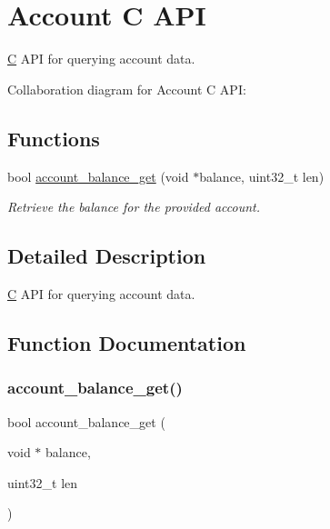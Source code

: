 \hypertarget{group__accountcapi}{}\section{Account C A\+PI}
\label{group__accountcapi}


\mbox{\hyperlink{struct_c}{C}} A\+PI for querying account data.  


Collaboration diagram for Account C A\+PI\+:
\subsection*{Functions}
\begin{DoxyCompactItemize}
\item 
bool \mbox{\hyperlink{group__accountcapi_gabc0d83c30cea31ccd9c5155f5292eab7}{account\+\_\+balance\+\_\+get}} (void $\ast$balance, uint32\+\_\+t len)
\begin{DoxyCompactList}\small\item\em Retrieve the balance for the provided account. \end{DoxyCompactList}\end{DoxyCompactItemize}


\subsection{Detailed Description}
\mbox{\hyperlink{struct_c}{C}} A\+PI for querying account data. 



\subsection{Function Documentation}
\mbox{\label{group__accountcapi_gabc0d83c30cea31ccd9c5155f5292eab7}} 
\subsubsection{\texorpdfstring{account\+\_\+balance\+\_\+get()}{account\_balance\_get()}}
{\footnotesize\ttfamily bool account\+\_\+balance\+\_\+get (\begin{DoxyParamCaption}\item[{void $\ast$}]{balance,  }\item[{uint32\+\_\+t}]{len }\end{DoxyParamCaption})}




